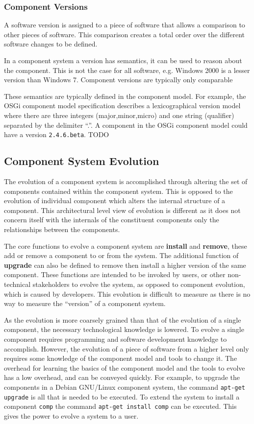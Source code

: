 \subsubsection{Component Versions}
A software version is assigned to a piece of software that allows a comparison to other pieces of software.
This comparison creates a total order over the different software changes to be defined.

In a component system a version has semantics, it can be used to reason about the component.
This is not the case for all software, e.g. Windows 2000 is a lesser version than Windows 7.
Component versions are typically only comparable 

These semantics are typically defined in the component model.
For example, the OSGi component model specification \citep{osgicore2007} describes a lexicographical version model 
where there are three integers (major,minor,micro) and one string (qualifier) separated by the delimiter ``.''.
A component in the OSGi component model could have a version \verb+2.4.6.beta+.
TODO


\subsection{Component System Evolution}
The evolution of a component system is accomplished through altering the set of components contained within the component system.
This is opposed to the evolution of individual component which alters the internal structure of a component.
This architectural level view of evolution is different as it does not concern itself with the internals of the constituent components only the relationships between the components.

The core functions to evolve a component system are \textbf{install} and \textbf{remove}, these add or remove a component to or from the system.
The additional function of \textbf{upgrade} can also be defined to remove then install a higher version of the same component. 
These functions are intended to be invoked by users, or other non-technical stakeholders to evolve the system,
as opposed to component evolution, which is caused by developers.
This evolution is difficult to measure as there is no way to measure the ``version'' of a component system.
 
As the evolution is more coarsely grained than that of the evolution of a single component, the necessary technological knowledge is lowered.
To evolve a single component requires programming and software development knowledge to accomplish.
However, the evolution of a piece of software from a higher level only requires some knowledge of the component model and tools to change it.
The overhead for learning the basics of the component model and the tools to evolve has a low overhead, and can be conveyed quickly.
For example, to upgrade the components in a Debian GNU/Linux component system, the command \verb+apt-get upgrade+ is all that is needed to be executed.
To extend the system to install a component \verb+comp+ the command \verb+apt-get install comp+ can be executed.
This gives the power to evolve a system to a user.

